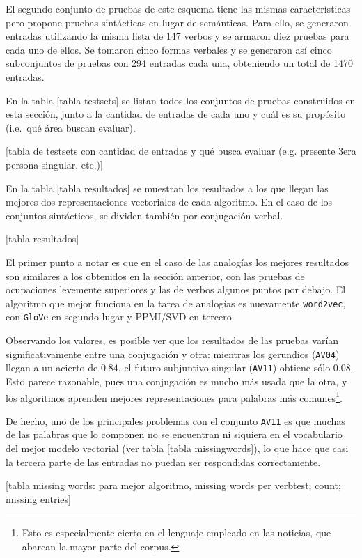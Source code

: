 El segundo conjunto de pruebas de este esquema tiene las mismas características pero propone pruebas
sintácticas en lugar de semánticas. Para ello, se generaron entradas utilizando la misma lista de
147 verbos y se armaron diez pruebas para cada uno de ellos. Se tomaron cinco formas verbales y se
generaron así cinco subconjuntos de pruebas con 294 entradas cada una, obteniendo un total de 1470
entradas.

En la tabla [tabla testsets] se listan todos los conjuntos de pruebas construidos en esta sección,
junto a la cantidad de entradas de cada uno y cuál es su propósito (i.e.\ qué área buscan evaluar).

[tabla de testsets con cantidad de entradas y qué busca evaluar (e.g. presente 3era persona singular, etc.)]

\quad

En la tabla [tabla resultados] se muestran los resultados a los que llegan las mejores dos
representaciones vectoriales de cada algoritmo. En el caso de los conjuntos sintácticos, se dividen
también por conjugación verbal.

[tabla resultados]

El primer punto a notar es que en el caso de las analogías los mejores resultados son similares a
los obtenidos en la sección anterior, con las pruebas de ocupaciones levemente superiores y las de
verbos algunos puntos por debajo. El algoritmo que mejor funciona en la tarea de analogías es
nuevamente \texttt{word2vec}, con \texttt{GloVe} en segundo lugar y PPMI/SVD en tercero.

Observando los valores, es posible ver que los resultados de las pruebas varían significativamente
entre una conjugación y otra: mientras los gerundios (\texttt{AV04}) llegan a un acierto de $0.84$,
el futuro subjuntivo singular (\texttt{AV11}) obtiene sólo $0.08$. Esto parece razonable, pues una
conjugación es mucho más usada que la otra, y los algoritmos aprenden mejores representaciones para
palabras más comunes\footnote{Esto es especialmente cierto en el lenguaje empleado en las noticias,
que abarcan la mayor parte del corpus.}.

De hecho, uno de los principales problemas con el conjunto \texttt{AV11} es que muchas de las
palabras que lo componen no se encuentran ni siquiera en el vocabulario del mejor modelo vectorial
(ver tabla [tabla missingwords]), lo que hace que casi la tercera parte de las entradas no puedan
ser respondidas correctamente.

[tabla missing words: para mejor algoritmo, missing words per verbtest; count; missing entries]

